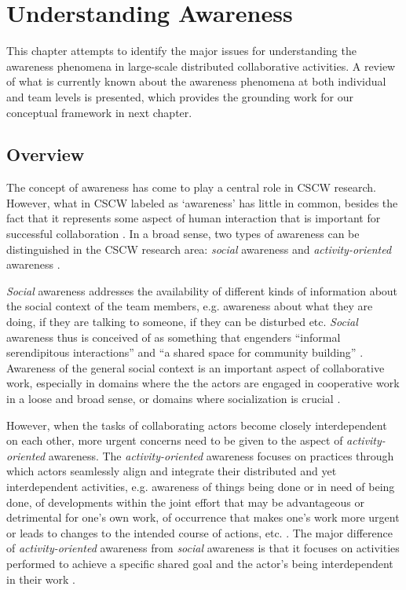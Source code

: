 \graphicspath{{Figures/}}
\chapter{Understanding Awareness} %
\label{cha:understanding_awareness}
This chapter attempts to identify the major issues for understanding the awareness phenomena in large-scale distributed collaborative activities. A review of what is currently known about the awareness phenomena at both individual and team levels is presented, which provides the grounding work for our conceptual framework in next chapter.
\section{Overview} %
\label{sec:overview}
The concept of awareness has come to play a central role in CSCW research. However, what in CSCW labeled as `awareness' has little in common, besides the fact that it represents some aspect of human interaction that is important for successful collaboration \cite{schmidt2002a}. In a broad sense, two types of awareness can be distinguished in the CSCW research area: \emph{social} awareness and \emph{activity-oriented} awareness \cite{prinz1999a,schmidt2002a,carroll2003a}.

\emph{Social} awareness addresses the availability of different kinds of information about the social context of the team members, e.g. awareness about what they are doing, if they are talking to someone, if they can be disturbed etc. \emph{Social} awareness thus is conceived of as something that engenders ``informal serendipitous interactions'' \cite{hudson1996a} and ``a shared space for community building'' \cite{Dourish1992}. Awareness of the general social context is an important aspect of collaborative work, especially in domains where the the actors are engaged in cooperative work in a loose and broad sense, or domains where socialization is crucial \cite{schmidt2002a}.

However, when the tasks of collaborating actors become closely interdependent on each other, more urgent concerns need to be given to the aspect of \emph{activity-oriented} awareness. The \emph{activity-oriented} awareness focuses on practices through which actors seamlessly align and integrate their distributed and yet interdependent activities, e.g. awareness of things being done or in need of being done, of developments within the joint effort that may be advantageous or detrimental for one’s own work, of occurrence that makes one’s work more urgent or leads to changes to the intended course of actions, etc. \cite{schmidt2002a}. The major difference of \emph{activity-oriented} awareness from \emph{social} awareness is that it focuses on activities performed to achieve a specific shared goal \cite{carroll2003a} and the actor’s being interdependent in their work \cite{schmidt2002a}.

